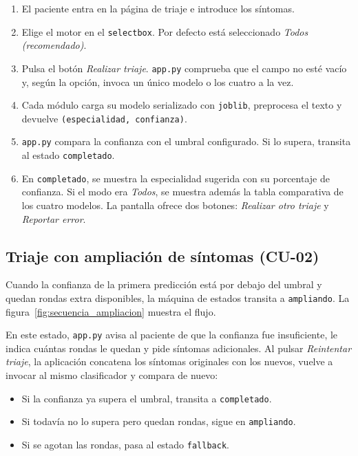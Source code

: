 \begin{enumerate}
	\item El paciente entra en la página de triaje e introduce los síntomas. 
	\item Elige el motor en el \texttt{selectbox}. Por defecto está seleccionado \textit{Todos (recomendado)}.
	\item Pulsa el botón \textit{Realizar triaje}. \texttt{app.py} comprueba que el campo no esté vacío y, según la opción, invoca un único modelo o los cuatro a la vez.
	\item Cada módulo carga su modelo serializado con \texttt{joblib}, preprocesa el texto y devuelve \texttt{(especialidad, confianza)}.
	\item \texttt{app.py} compara la confianza con el umbral configurado. Si lo supera, transita al estado \texttt{completado}.
	\item En \texttt{completado}, se muestra la especialidad sugerida con su porcentaje de confianza. Si el modo era \textit{Todos}, se muestra además la tabla comparativa de los cuatro modelos. La pantalla ofrece dos botones: \textit{Realizar otro triaje} y \textit{Reportar error}.
\end{enumerate}

\subsection*{Triaje con ampliación de síntomas (CU-02)}

Cuando la confianza de la primera predicción está por debajo del umbral y quedan rondas extra disponibles, la máquina de estados transita a \texttt{ampliando}. La figura~\ref{fig:secuencia_ampliacion} muestra el flujo.


En este estado, \texttt{app.py} avisa al paciente de que la confianza fue insuficiente, le indica cuántas rondas le quedan y pide síntomas adicionales. Al pulsar \textit{Reintentar triaje}, la aplicación concatena los síntomas originales con los nuevos, vuelve a invocar al mismo clasificador y compara de nuevo:

\begin{itemize}
	\item Si la confianza ya supera el umbral, transita a \texttt{completado}.
	\item Si todavía no lo supera pero quedan rondas, sigue en \texttt{ampliando}.
	\item Si se agotan las rondas, pasa al estado \texttt{fallback}.
\end{itemize}

